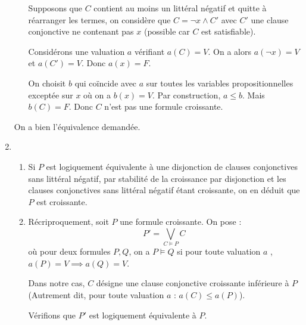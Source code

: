 \documentclass[a4paper, 11pt]{article}
\begin{document}
\begin{enumerate}
\begin{itemize}
Supposons que $C$ contient au moins un littéral négatif et quitte à réarranger les termes, on considère que $C=\neg x \wedge C'$ avec  $C'$ une clause conjonctive ne contenant pas $x$ (possible car $C$ est satisfiable).


Considérons une valuation $a$ vérifiant $a(C)=V$. On a alors  $a(\neg x)=V $ et $a(C')=V$. Donc $a(x)=F$.

On choisit  $b$ qui coïncide avec $a$ sur toutes les variables propositionnelles exceptée sur $x$ où on a $b(x)=V$. Par construction, $a\leq b$. Mais  $b(C)=F$. Donc  $C$ n'est pas une formule croissante.
                \end{itemize}
On a bien l'équivalence demandée.
                

    \item 
\begin{enumerate}
    \item Si $P$ est logiquement équivalente à une disjonction de clauses conjonctives sans littéral négatif, par stabilité de la croissance par disjonction et les clauses conjonctives sans littéral négatif étant croissante, on en déduit que $P$ est croissante.

        
    \item Récriproquement, soit $P$ une formule croissante. On pose :
        $$P' = \bigvee_{C \vDash P}C $$
        où pour deux formules $P,Q$, on a $P\vDash Q$ si  pour toute valuation $a$ ,  $a(P)=V \implies a(Q)=V$. 

        Dans notre cas, $C$ désigne une clause conjonctive croissante inférieure à  $P$ (Autrement dit, pour toute valuation $a$ : $a(C)\leq a(P)$).

        Vérifions que  $P'$ est logiquement équivalente à  $P$. 


\end{enumerate}
\end{enumerate}
\end{document}
